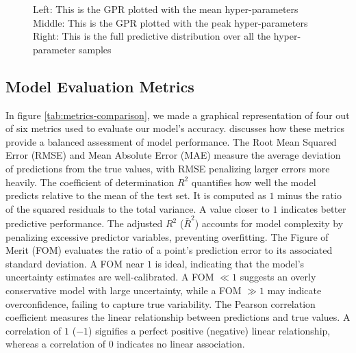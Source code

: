 \documentclass{article}
\begin{document}
\begin{figure}[H]
\begin{subfigure}[b]{0.3\textwidth}
    \end{subfigure}
    \caption{
        Left: This is the GPR plotted with the mean hyper-parameters
        Middle: This is the GPR plotted with the peak hyper-parameters
        Right: This is the full predictive distribution over all the hyper-parameter samples
     }
\end{figure}



\subsection{Model Evaluation Metrics}
\label{sec:metrics}

In figure \ref{tab:metrics-comparison}, we made a graphical representation of four out of six metrics used to evaluate our model’s accuracy. \cite{bible} discusses how these metrics provide a balanced assessment of model performance.
The Root Mean Squared Error (RMSE) and Mean Absolute Error (MAE) measure the average deviation of predictions from the true values, with RMSE penalizing larger errors more heavily.
The coefficient of determination \( R^2 \) quantifies how well the model predicts relative to the mean of the test set. It is computed as \( 1 \) minus the ratio of the squared residuals to the total variance. A value closer to \( 1 \) indicates better predictive performance.
The adjusted \( R^2 \) (\(\bar{R}^2\)) accounts for model complexity by penalizing excessive predictor variables, preventing overfitting.
The Figure of Merit (FOM) evaluates the ratio of a point’s prediction error to its associated standard deviation. A FOM near \( 1 \) is ideal, indicating that the model’s uncertainty estimates are well-calibrated. A FOM \( \ll 1 \) suggests an overly conservative model with large uncertainty, while a FOM \( \gg 1 \) may indicate overconfidence, failing to capture true variability.
The Pearson correlation coefficient measures the linear relationship between predictions and true values. A correlation of \( 1 \) (\(-1\)) signifies a perfect positive (negative) linear relationship, whereas a correlation of \( 0 \) indicates no linear association.
\end{document}
